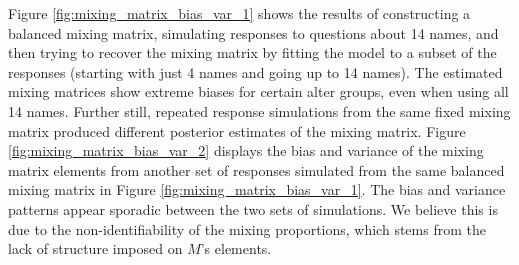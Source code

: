 Figure \ref{fig:mixing_matrix_bias_var_1} shows the results of constructing a balanced mixing matrix, simulating responses to questions about 14 names, and then trying to recover the mixing matrix by fitting the \citet{McCormick+others:2010} model to a subset of the responses (starting with just 4 names and going up to 14 names). The estimated mixing matrices show extreme biases for certain alter groups, even when using all 14 names. Further still, repeated response simulations from the same fixed mixing matrix produced different posterior estimates of the mixing matrix. Figure \ref{fig:mixing_matrix_bias_var_2} displays the bias and variance of the mixing matrix elements from another set of responses simulated from the same balanced mixing matrix in Figure \ref{fig:mixing_matrix_bias_var_1}. The bias and variance patterns appear sporadic between the two sets of simulations. We believe this is due to the non-identifiability of the mixing proportions, which stems from the lack of structure imposed on $M$'s elements. 

